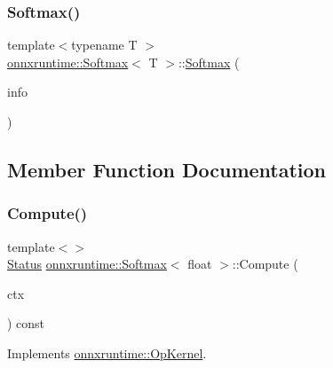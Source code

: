 \subsubsection{\texorpdfstring{Softmax()}{Softmax()}}
{\footnotesize\ttfamily template$<$typename T $>$ \\
\mbox{\hyperlink{classonnxruntime_1_1Softmax}{onnxruntime\+::\+Softmax}}$<$ T $>$\+::\mbox{\hyperlink{classonnxruntime_1_1Softmax}{Softmax}} (\begin{DoxyParamCaption}\item[{const \mbox{\hyperlink{classonnxruntime_1_1OpKernelInfo}{Op\+Kernel\+Info}} \&}]{info }\end{DoxyParamCaption})\hspace{0.3cm}{\ttfamily [inline]}}



\subsection{Member Function Documentation}
\mbox{\label{classonnxruntime_1_1Softmax_a363ef1859042443541111bcee368a8ea}} 
\subsubsection{\texorpdfstring{Compute()}{Compute()}\hspace{0.1cm}{\footnotesize\ttfamily [1/2]}}
{\footnotesize\ttfamily template$<$$>$ \\
\mbox{\hyperlink{classonnxruntime_1_1common_1_1Status}{Status}} \mbox{\hyperlink{classonnxruntime_1_1Softmax}{onnxruntime\+::\+Softmax}}$<$ float $>$\+::Compute (\begin{DoxyParamCaption}\item[{\mbox{\hyperlink{classonnxruntime_1_1OpKernelContext}{Op\+Kernel\+Context}} $\ast$}]{ctx }\end{DoxyParamCaption}) const\hspace{0.3cm}{\ttfamily [virtual]}}



Implements \mbox{\hyperlink{classonnxruntime_1_1OpKernel_a9eca8656a78b1b3ab9d3351a12798650}{onnxruntime\+::\+Op\+Kernel}}.

\mbox{\label{classonnxruntime_1_1Softmax_a98fb9dfe120c3c2451251957ca40b0e4}} 
